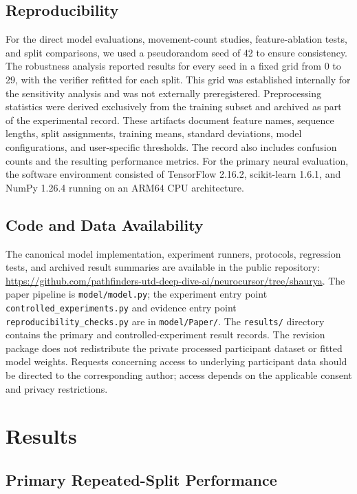 \documentclass[conference]{IEEEtran}
\begin{document}
\subsection{Reproducibility}

For the direct model evaluations, movement-count studies, feature-ablation tests, and split comparisons, we used a pseudorandom seed of 42 to ensure consistency. The robustness analysis reported results for every seed in a fixed grid from 0 to 29, with the verifier refitted for each split. This grid was established internally for the sensitivity analysis and was not externally preregistered. Preprocessing statistics were derived exclusively from the training subset and archived as part of the experimental record. These artifacts document feature names, sequence lengths, split assignments, training means, standard deviations, model configurations, and user-specific thresholds. The record also includes confusion counts and the resulting performance metrics. For the primary neural evaluation, the software environment consisted of TensorFlow 2.16.2, scikit-learn 1.6.1, and NumPy 1.26.4 running on an ARM64 CPU architecture.

\subsection{Code and Data Availability}
\label{sec:availability}

The canonical model implementation, experiment runners, protocols, regression
tests, and archived result summaries are available in the public repository:
\url{https://github.com/pathfinders-utd-deep-dive-ai/neurocursor/tree/shaurya}.
The paper pipeline is \texttt{model/model.py}; the experiment entry point
\texttt{controlled\_experiments.py} and evidence entry point
\texttt{reproducibility\_checks.py} are in \texttt{model/Paper/}. The
\texttt{results/} directory contains the primary and controlled-experiment result
records. The revision package does not redistribute the private processed
participant dataset or fitted model weights. Requests concerning access to
underlying participant data should be directed to the corresponding author;
access depends on the applicable consent and privacy restrictions.

\section{Results}

\subsection{Primary Repeated-Split Performance}
\end{document}
